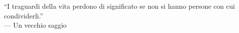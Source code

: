 
\cleardoublepage
{}
\thispagestyle{empty}

\vspace*{3cm}

\begin{center}
``I traguardi della vita perdono di significato se non si hanno persone con cui condividerli.'' \\ \medskip
--- Un vecchio saggio 
\end{center}

\medskip

\begin{center}

\end{center}
